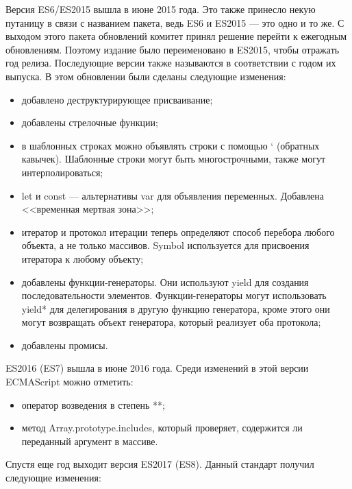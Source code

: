 Версия ES6/ES2015 вышла в июне 2015 года. Это также принесло некую путаницу в связи с названием пакета, ведь ES6 и ES2015 — это одно и то же. С выходом этого пакета обновлений комитет принял решение перейти к ежегодным обновлениям. Поэтому издание было переименовано в ES2015, чтобы отражать год релиза. Последующие версии также называются в соответствии с годом их выпуска. В этом обновлении были сделаны следующие изменения:

\begin{itemize}
    \item добавлено деструктурирующее присваивание;
    \item добавлены стрелочные функции;
    \item в шаблонных строках можно объявлять строки с помощью ` (обратных кавычек). Шаблонные строки могут быть многострочными, также могут интерполироваться;
    \item let и const — альтернативы var для объявления переменных. Добавлена <<временная мертвая зона>>;
    \item итератор и протокол итерации теперь определяют способ перебора любого объекта, а не только массивов. Symbol используется для присвоения итератора к любому объекту;
    \item добавлены функции-генераторы. Они используют yield для создания последовательности элементов. Функции-генераторы могут использовать yield* для делегирования в другую функцию генератора, кроме этого они могут возвращать объект генератора, который реализует оба протокола;
    \item добавлены промисы.
\end{itemize}

ES2016 (ES7) вышла в июне 2016 года. Среди изменений в этой версии ECMAScript можно отметить:

\begin{itemize}
    \item оператор возведения в степень **;
    \item метод Array.prototype.includes, который проверяет, содержится ли переданный аргумент в массиве.
\end{itemize}

Спустя еще год выходит версия ES2017 (ES8). Данный стандарт получил следующие изменения:

